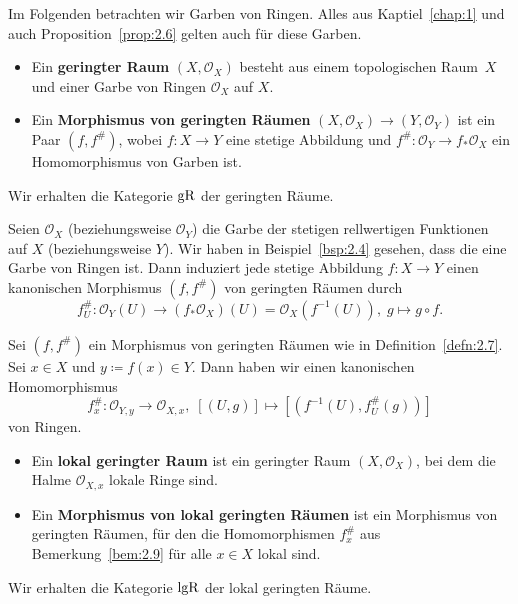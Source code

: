 Im Folgenden betrachten wir Garben von Ringen. Alles aus Kaptiel~\ref{chap:1} und auch Proposition~\ref{prop:2.6} gelten auch für diese Garben.

\begin{defn}
\label{defn:2.7}
	\begin{itemize}
		\item Ein \textbf{geringter Raum} $(X, \mathcal{O}_X)$ besteht aus einem topologischen Raum~$X$ und einer Garbe von Ringen $\mathcal{O}_X$ auf $X$.
		\item Ein \textbf{Morphismus von geringten Räumen} $(X, \mathcal{O}_X) \to (Y, \mathcal{O}_Y)$ ist ein Paar $(f, f^{\#})$, wobei $f\colon X \to Y$ eine stetige Abbildung und $f^{\#}\colon \mathcal{O}_Y \to f_*\mathcal{O}_X$ ein Homomorphismus von Garben ist.
	\end{itemize}
	Wir erhalten die Kategorie $\operatorname{gR}$ der geringten Räume.
\end{defn}

\begin{bsp}
\label{bsp:2.8}
	Seien $\mathcal{O}_X$ (beziehungsweise $\mathcal{O}_Y$) die Garbe der stetigen rellwertigen Funktionen auf $X$ (beziehungsweise $Y$). Wir haben in Beispiel~\ref{bsp:2.4} gesehen, dass die eine Garbe von Ringen ist. Dann induziert jede stetige Abbildung $f\colon X \to Y$ einen kanonischen Morphismus $(f,f^{\#})$ von geringten Räumen durch
	\[
		f^{\#}_U\colon \mathcal{O}_Y(U) \to (f_*\mathcal{O}_X)(U) = \mathcal{O}_X(f^{-1}(U)),\; g \mapsto g \circ f.
	\]
\end{bsp}

\begin{bem}
\label{bem:2.9}
	Sei $(f,f^{\#})$ ein Morphismus von geringten Räumen wie in Definition~\ref{defn:2.7}. Sei $x \in X$ und $y \coloneqq f(x)\in Y$. Dann haben wir einen kanonischen Homomorphismus
	\[
		f_x^{\#}\colon \mathcal{O}_{Y,y} \to \mathcal{O}_{X,x},\; [(U,g)] \mapsto [(f^{-1}(U),f^{\#}_U(g))]
	\]
	von Ringen.
\end{bem}

\begin{defn}
	\begin{itemize}
		\item Ein \textbf{lokal geringter Raum} ist ein geringter Raum $(X,\mathcal{O}_X)$, bei dem die Halme $\mathcal{O}_{X,x}$ lokale Ringe sind.
		\item Ein \textbf{Morphismus von lokal geringten Räumen} ist ein Morphismus von geringten Räumen, für den die Homomorphismen $f_x^{\#}$ aus Bemerkung~\ref{bem:2.9} für alle $x \in X$ lokal sind.
	\end{itemize}
	Wir erhalten die Kategorie $\operatorname{lgR}$ der lokal geringten Räume.
\end{defn}

